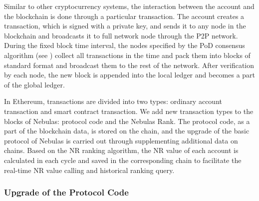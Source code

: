 Similar to other cryptocurrency systems, the interaction between the account and the blockchain is done through a particular transaction. The account creates a transaction, which is signed with a private key, and sends it to any node in the blockchain and broadcasts it to full network node through the P2P network. During the fixed block time interval, the nodes specified by the PoD consensus algorithm (see ) collect all transactions in the time and pack them into blocks of standard format and broadcast them to the rest of the network. After verification by each node, the new block is appended into the local ledger and becomes a part of the global ledger.


In Ethereum, transactions are divided into two types: ordinary account transaction and smart contract transaction. We add new transaction types to the blocks of Nebulas: protocol code and the Nebulas Rank. The protocol code, as a part of the blockchain data, is stored on the chain, and the upgrade of the basic protocol of Nebulas is carried out through supplementing additional data on chains. Based on the NR ranking algorithm, the NR value of each account is calculated in each cycle and saved in the corresponding chain to facilitate the real-time NR value calling and historical ranking query.


\subsubsection{Upgrade of the Protocol Code}

